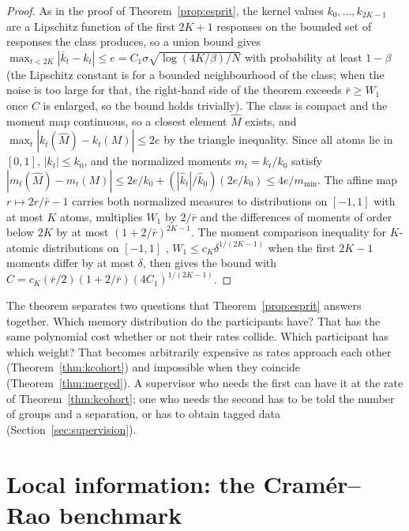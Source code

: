 \documentclass[12pt]{article}
\theoremstyle{definition}
\theoremstyle{remark}
\begin{document}
\begin{proof}
As in the proof of Theorem~\ref{prop:esprit}, the kernel values $k_0,\ldots,k_{2K-1}$ are a Lipschitz function of the first $2K+1$ responses on the bounded set of responses the class produces, so a union bound gives $\max_{t<2K}|\bar k_t-k_t|\le e=C_1\sigma\sqrt{\log(4K/\beta)/N}$ with probability at least $1-\beta$ (the Lipschitz constant is for a bounded neighbourhood of the class; when the noise is too large for that, the right-hand side of the theorem exceeds $\bar r\ge W_1$ once $C$ is enlarged, so the bound holds trivially). The class is compact and the moment map continuous, so a closest element $\hat M$ exists, and $\max_t|k_t(\hat M)-k_t(M)|\le2e$ by the triangle inequality. Since all atoms lie in $[0,1]$, $|k_t|\le k_0$, and the normalized moments $m_t=k_t/k_0$ satisfy $|m_t(\hat M)-m_t(M)|\le2e/k_0+(|\hat k_t|/\hat k_0)(2e/k_0)\le4e/m_{\min}$. The affine map $r\mapsto2r/\bar r-1$ carries both normalized measures to distributions on $[-1,1]$ with at most $K$ atoms, multiplies $W_1$ by $2/\bar r$ and the differences of moments of order below $2K$ by at most $(1+2/\bar r)^{2K-1}$. The moment comparison inequality for $K$-atomic distributions on $[-1,1]$ \citep{wu2020}, $W_1\le c_K\delta^{1/(2K-1)}$ when the first $2K-1$ moments differ by at most $\delta$, then gives the bound with $C=c_K(\bar r/2)(1+2/\bar r)(4C_1)^{1/(2K-1)}$.
\end{proof}

The theorem separates two questions that Theorem~\ref{prop:esprit} answers together. Which memory distribution do the participants have? That has the same polynomial cost whether or not their rates collide. Which participant has which weight? That becomes arbitrarily expensive as rates approach each other (Theorem~\ref{thm:kcohort}) and impossible when they coincide (Theorem~\ref{thm:merged}). A supervisor who needs the first can have it at the rate of Theorem~\ref{thm:kcohort}; one who needs the second has to be told the number of groups and a separation, or has to obtain tagged data (Section~\ref{sec:supervision}).

\section{Local information: the Cram\'er--Rao benchmark}
\end{document}
